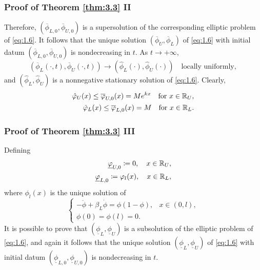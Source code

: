 \begin{frame}
    \frametitle{Proof of Theorem \ref{thm:3.3} II}
    \begin{proofc}
        Therefore, \((\overline{\phi}_{L,0}, \overline{\phi}_{U,0})\) is a supersolution of the corresponding elliptic problem of \eqref{eq:1.6}. It follows that the unique solution \((\overline{\phi}_U, \overline{\phi}_L)\) of \eqref{eq:1.6} with initial datum \((\overline{\phi}_{L,0}, \overline{\phi}_{U,0})\) is nondecreasing in \(t\).
        As \(t \to +\infty\),
        \[
                (\overline{\phi}_L(\cdot, t), \overline{\phi}_U(\cdot, t)) \to (\hat{\phi}_L(\cdot), \hat{\phi}_U(\cdot)) \quad \text{locally uniformly},
        \]
        and \((\hat{\phi}_L, \hat{\phi}_U)\) is a nonnegative stationary solution of \eqref{eq:1.6}. Clearly,
        \begin{align*}
            \hat{\varphi}_U(x) \leq \overline{\varphi}_{U,0}(x) = M e^{kx} \quad \text{for } x \in \mathbb{R}_U, \\
            \hat{\varphi}_L(x) \leq \overline{\varphi}_{L,0}(x) = M \quad \text{for } x \in \mathbb{R}_L.
        \end{align*}
    \end{proofc}
\end{frame}


\begin{frame}
    \frametitle{Proof of Theorem \ref{thm:3.3} III}
    \begin{proofc}
        Defining 
        \begin{align*}
                \underline{\varphi}_{U,0} \coloneqq 0, \quad x \in \mathbb{R}_U, \\
                    \underline{\varphi}_{L,0} \coloneqq \varphi_l(x), \quad x \in \mathbb{R}_L,
        \end{align*}
        where \(\phi_l(x)\) is the unique solution of
        \begin{equation*}
            \begin{cases}
                -\ddot{\phi} + \beta_L \dot{\phi} = \phi(1 - \phi), & x \in (0, l), \\
                \phi(0) = \phi(l) = 0.
            \end{cases}
        \end{equation*}
        It is possible to prove that \((\underline{\phi}_L, \underline{\phi}_U)\) is a subsolution of the elliptic problem of \eqref{eq:1.6}, and again it follows that the unique solution \((\underline{\phi}_L, \underline{\phi}_U)\) of \eqref{eq:1.6} with initial datum \((\underline{\phi}_{L,0}, \underline{\phi}_{U,0})\) is nondecreasing in \(t\).
    \end{proofc}
\end{frame}

